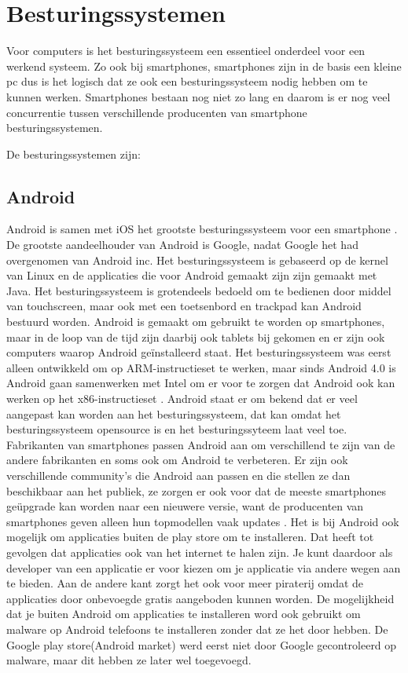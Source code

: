 ﻿\chapter{Besturingssystemen}

Voor computers is het besturingssysteem een essentieel onderdeel voor een werkend systeem. Zo ook bij smartphones, smartphones zijn in de basis een kleine pc dus is het logisch dat ze ook een besturingssysteem nodig hebben om te kunnen werken. Smartphones bestaan nog niet zo lang en daarom is er nog veel concurrentie tussen verschillende producenten van smartphone besturingssystemen.

De besturingssystemen zijn:

\section{Android}

Android is samen met iOS het grootste besturingssysteem voor een smartphone \citep{canalys}. De grootste aandeelhouder van Android is Google, nadat Google het had overgenomen van Android inc. Het besturingssysteem is gebaseerd op de kernel van Linux en de applicaties die voor Android gemaakt zijn zijn gemaakt met Java. Het besturingssysteem is grotendeels bedoeld om te bedienen door middel van touchscreen, maar ook met een toetsenbord en trackpad kan Android bestuurd worden. Android is gemaakt om gebruikt te worden op smartphones, maar in de loop van de tijd zijn daarbij ook tablets bij gekomen en er zijn ook computers waarop Android ge\"installeerd staat. Het besturingssysteem was eerst alleen ontwikkeld om op ARM-instructieset te werken, maar sinds Android 4.0 is Android gaan samenwerken met Intel om er voor te zorgen dat Android ook kan werken op het x86-instructieset \citep{pcmweb}. Android staat er om bekend dat er veel aangepast kan worden aan het besturingssysteem, dat kan omdat het besturingssysteem opensource is en het besturingssyteem laat veel toe. Fabrikanten van smartphones passen Android aan om verschillend te zijn van de andere fabrikanten en soms ook om Android te verbeteren. Er zijn ook verschillende community's die Android aan passen en die stellen ze dan beschikbaar aan het publiek, ze zorgen er ook voor dat de meeste smartphones geüpgrade kan worden naar een nieuwere versie, want de producenten van smartphones geven alleen hun topmodellen vaak updates \citep{gsmacties}. Het is bij Android ook mogelijk om applicaties buiten de play store om te installeren. Dat heeft tot gevolgen dat applicaties ook van het internet te halen zijn. Je kunt daardoor als developer van een applicatie er voor kiezen om je applicatie via andere wegen aan te bieden. Aan de andere kant zorgt het ook voor meer piraterij omdat de applicaties door onbevoegde gratis aangeboden kunnen worden. De mogelijkheid dat je buiten Android om applicaties te installeren word ook gebruikt om malware op Android telefoons te installeren zonder dat ze het door hebben. De Google play store(Android market) werd eerst niet door Google gecontroleerd op malware, maar dit hebben ze later wel toegevoegd\citep{zdnet}.


